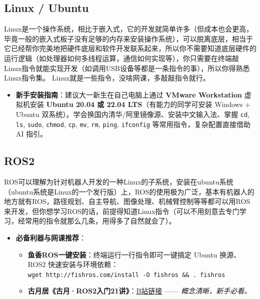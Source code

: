 \documentclass[a4paper,11pt,oneside]{scrreprt}
\newcommand{\inlinecode}[1]{%
    \colorbox{CTLightGray}{\texttt{\small #1}}%
}
\begin{document}
\subsection{Linux / Ubuntu}

Linux是一个操作系统，相比于嵌入式，它的开发就简单许多（但成本也会更高，毕竟一般的嵌入式板子没有足够的内存来安装操作系统），可以脱离底层，相当于它已经帮你完美地把硬件底层和软件开发联系起来，所以你不需要知道底层硬件的运行逻辑（如处理器如何多线程运算，通信如何实现等），你只需要在终端敲Linux指令就能实现开发（如调用USB设备等都是一条指令的事），所以你得熟悉Linux指令集。
Linux就是一些指令，没啥网课，多敲敲指令就行。

\begin{itemize}
    \item \textbf{新手安装指南}：建议大一新生在自己电脑上通过 \textbf{VMware Workstation} 虚拟机安装 \textbf{Ubuntu 20.04 或 22.04 LTS}（有能力的同学可安装 Windows + Ubuntu 双系统）。学会换国内清华/阿里镜像源、安装中文输入法、掌握 \texttt{cd}, \texttt{ls}, \texttt{sudo}, \texttt{chmod}, \texttt{cp}, \texttt{mv}, \texttt{rm}, \texttt{ping}, \texttt{ifconfig} 等常用指令，复杂配置直接借助 AI 指引。
\end{itemize}

\subsection{ROS2}

ROS可以理解为针对机器人开发的一种Linux的子系统，安装在ubuntu系统（ubuntu系统是Linux的一个发行版）上，ROS的使用极为广泛，基本有机器人的地方就有ROS，路径规划、自主导航、图像处理、机械臂控制等等都可以用ROS来开发，但你想学习ROS的话，前提得知道Linux指令（可以不用刻意去专门学习，经常用的指令就那么几条，用得多了自然就会了）。

\begin{itemize}
    \item \textbf{必备利器与网课推荐}：
    \begin{itemize}
        \item \textbf{鱼香ROS一键安装}：终端运行一行指令即可一键搞定 Ubuntu 换源、ROS2 快速安装与环境依赖：\\
        \inlinecode{wget http://fishros.com/install -O fishros \&\& . fishros}
        \item \textbf{古月居《古月·ROS2入门21讲》}：\href{https://www.bilibili.com/video/BV1gr4y1Q7j5/}{\underline{B站链接}} —— \textit{概念清晰，新手必看。}
    \end{itemize}
\end{itemize}
\end{document}
